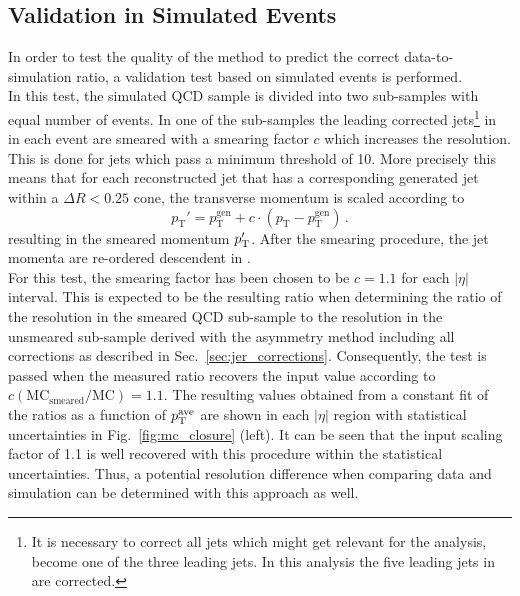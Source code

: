 \subsection{Validation in Simulated Events}
\label{sec:jer_validation_closure}
In order to test the quality of the method to predict the correct data-to-simulation ratio, a validation test based on simulated events is performed. \\ 
In this test, the simulated \pythia QCD sample is divided into two sub-samples with equal number of events. In one of the sub-samples the leading corrected jets\footnote{It is necessary to correct all jets which might get relevant for the analysis, \ie become one of the three leading jets. In this analysis the five leading jets in \pt are corrected.} in \pt in each event are smeared with a smearing factor $c$ which increases the \pt resolution. This is done for jets which pass a minimum \pt threshold of 10\gev. More precisely this means that for each reconstructed jet that has a corresponding generated jet within a $\Delta R < 0.25$ cone, the transverse momentum is scaled according to
\begin{equation}
 p_\mathrm{T}' = p^\mathrm{gen}_\mathrm{T} + c \cdot (p_\mathrm{T} - p^\mathrm{gen}_\mathrm{T}) \, .
\label{eq:smear_gen}
\end{equation} 
resulting in the smeared momentum $p_{\text{T}}'$. After the smearing procedure, the jet momenta are re-ordered descendent in \pt.\\
For this test, the smearing factor has been chosen to be $c = 1.1$ for each $|\eta|$ interval. This is expected to be the resulting ratio when determining the ratio of the resolution in the smeared QCD sub-sample to the resolution in the unsmeared sub-sample derived with the asymmetry method including all corrections as described in Sec.~\ref{sec:jer_corrections}. Consequently, the test is passed when the measured ratio recovers the input value according to $c\mathrm{(MC_{smeared}/MC)} = 1.1$. The resulting values obtained from a constant fit of the ratios as a function of $p_{\text{T}}^\mathrm{ave}$ are shown in each $|\eta|$ region with statistical uncertainties in Fig.~\ref{fig:mc_closure} (left). It can be seen that the input scaling factor of 1.1 is well recovered with this procedure within the statistical uncertainties. Thus, a potential resolution difference when comparing data and simulation can be determined with this approach as well.

